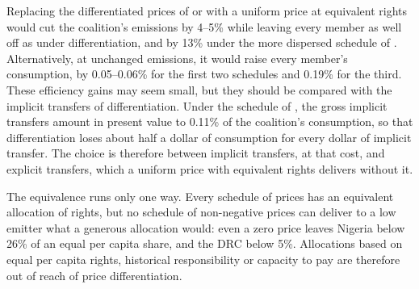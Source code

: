 \documentclass[12pt,english]{article}
\theoremstyle{remark}
\begin{document}
Replacing the differentiated prices of \citet{wolfram_building_2025} or \citet{banerjee_grand_2025} with a uniform price at equivalent rights would cut the coalition's emissions by 4--5\% %
while leaving every member as well off as under differentiation, and by 13\% under the more dispersed schedule of \citet{equal_right_climate_2023}. Alternatively, at unchanged emissions, it would raise every member's consumption, by 0.05--0.06\% for the first two schedules and 0.19\% for the third. %
These efficiency gains may seem small, but they should be compared with the implicit transfers of differentiation. Under the schedule of \citet{banerjee_grand_2025}, the gross implicit transfers amount in present value to 0.11\% of the coalition's consumption, so that differentiation loses about half a dollar of consumption for every dollar of implicit transfer. The choice is therefore between implicit transfers, at that cost, and explicit transfers, which a uniform price with equivalent rights delivers without it. %

The equivalence runs only one way. Every schedule of prices has an equivalent allocation of rights, but no schedule of non-negative prices can deliver to a low emitter what a generous allocation would: even a zero price leaves Nigeria below 26\% of an equal per capita share, and the DRC below 5\%. 
Allocations based on equal per capita rights, historical responsibility or capacity to pay are therefore out of reach of price differentiation. %
\end{document}
